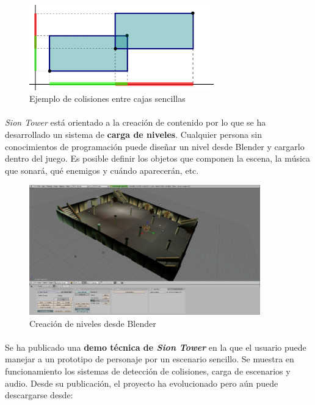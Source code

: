 \documentclass[16pt,spanish]{article}
\def \juego{\emph {Sion Tower} }
\begin{document}
\begin{figure}[H]
    \centering
        \includegraphics[width=8cm]{img/test-aabb-aabb.png} 
    \caption{Ejemplo de colisiones entre cajas sencillas}
    \label{img:colisiones}
\end{figure}

\paragraph{}
\juego está orientado a la creación de contenido por lo que se ha desarrollado
un sistema de \textbf{carga de niveles}. Cualquier persona sin conocimientos
de programación puede diseñar un nivel desde Blender y cargarlo dentro
del juego. Es posible definir los objetos que componen la escena, la música
que sonará, qué enemigos y cuándo aparecerán, etc.

\begin{figure}[H]
    \centering
        \includegraphics[width=10cm]{img/niveles-blender.jpg} 
    \caption{Creación de niveles desde Blender}
    \label{img:blender}
\end{figure}

\paragraph{}
Se ha publicado una \textbf{demo técnica de \juego} en la que el usuario
puede manejar a un prototipo de personaje por un escenario sencillo. Se
muestra en funcionamiento los sistemas de detección de colisiones, carga
de escenarios y audio. Desde su publicación, el proyecto ha evolucionado
pero aún puede descargarse desde:
\end{document}
